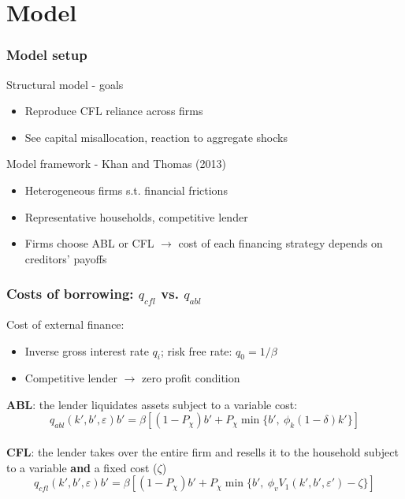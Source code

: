 \documentclass[notes]{beamer}
\begin{document}
\section{Model}
\begin{frame}[label=slide2]
\frametitle{Model setup}
Structural model - goals
\begin{itemize}
\item Reproduce CFL reliance across firms
\item See capital misallocation, reaction to aggregate shocks
\end{itemize} \vspace{5mm}

Model framework - Khan and Thomas (2013)
\begin{itemize}
\item Heterogeneous firms s.t. financial frictions
\item Representative households, competitive lender
\item Firms choose ABL or CFL $\rightarrow$ cost of each financing strategy depends on creditors' payoffs
\end{itemize}
\end{frame}

\begin{frame}[label=slide2]
\frametitle{Costs of borrowing: $q_{cfl}$ vs. $q_{abl}$}
Cost of external finance: 
\begin{itemize}
\item Inverse gross interest rate $q_i$; risk free rate: $q_0 = 1 / \beta$
\item Competitive lender $\rightarrow$ zero profit condition  
\end{itemize} \vspace{4mm}
\textbf{ABL}: the lender liquidates assets subject to a variable cost:
$$ q_{abl}(k',b',\varepsilon)b' = \beta \left[ (1-P_\chi) b' + P_\chi \min\{b', \ \phi_k (1-\delta) k' \} \right]  $$ \vspace{2mm} \\
\textbf{CFL}: the lender takes over the entire firm and resells it to the household subject to a variable \textbf{and} a fixed cost ($\zeta$)
$$ q_{cfl}(k',b',\varepsilon)b' = \beta \left[ (1-P_\chi) b' + P_\chi \min\{b', \ \phi_v V_1(k',b',\varepsilon') - \zeta \} \right]  $$ 
\end{frame}
\end{document}
